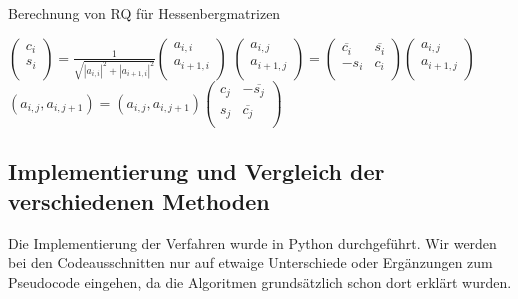 \documentclass{article}
\theoremstyle{plain}
\begin{document}
\begin{algorithm}
	\label{RQ_Hessenberg}
	\caption{Berechnung von RQ für Hessenbergmatrizen}
	\begin{algorithmic}[1]
		\State $\left(\begin{array}{c}
    c_i \\
    s_i \\
\end{array}\right)
=
\frac{1}{\sqrt{|a_{i,i}|^2 + |a_{i+1,i}|^2}}
\left(\begin{array}{c}
a_{i,i} \\
a_{i+1,i} \\
\end{array}\right)$
		\State $\left(\begin{array}{c}
		a_{i,j} \\
		a_{i+1,j}\\
		\end{array}\right)
		=
		\left(\begin{array}{cc}
		\overline{c_i} & \overline{s_i} \\
		-s_i & c_i \\
		\end{array}
		\right)
		\left(\begin{array}{c}
		a_{i,j} \\
		a_{i+1,j}\\
		\end{array}\right)$
		\EndFor
		\EndFor
			\State $\left(
			a_{i,j},
			a_{i,j+1}
			\right)
			=
			\left(
			a_{i,j},
			a_{i,j+1}
			\right)
			\left(\begin{array}{cc}
			c_j & -\overline{s_j} \\
			s_j & \overline{c_j} \\
			\end{array}
			\right)$
			\EndFor
			\EndFor
	\end{algorithmic}
\end{algorithm}

\newpage
\subsection{Implementierung und Vergleich der verschiedenen Methoden}

Die Implementierung der Verfahren wurde in Python durchgeführt. Wir werden bei den Codeausschnitten nur auf etwaige Unterschiede oder Ergänzungen zum Pseudocode eingehen, da die Algoritmen grundsätzlich schon dort erklärt wurden.\newline
\end{document}
